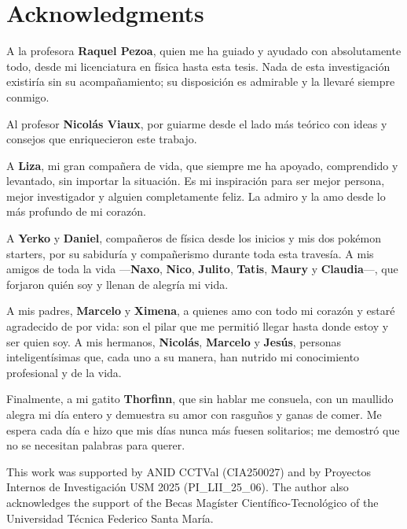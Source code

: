 \chapter*{Acknowledgments}
\linespread{1.12}\selectfont

A la profesora {\bfseries\color{darkred}Raquel Pezoa}, quien me ha guiado y
ayudado con absolutamente todo, desde mi licenciatura en física hasta esta tesis.
Nada de esta investigación existiría sin su acompañamiento; su disposición es
admirable y la llevaré siempre conmigo.

Al profesor {\bfseries\color{darkred}Nicolás Viaux}, por guiarme desde el lado
más teórico con ideas y consejos que enriquecieron este trabajo.

A {\bfseries\color{darkred}Liza}, mi gran compañera de vida, que siempre me ha
apoyado, comprendido y levantado, sin importar la situación. Es mi inspiración
para ser mejor persona, mejor investigador y alguien completamente feliz. La
admiro y la amo desde lo más profundo de mi corazón.

A {\bfseries\color{darkred}Yerko} y {\bfseries\color{darkred}Daniel},
compañeros de física desde los inicios y mis dos pokémon starters, por su
sabiduría y compañerismo durante toda esta travesía. A mis amigos de toda la
vida ---{\bfseries\color{darkred}Naxo}, {\bfseries\color{darkred}Nico},
{\bfseries\color{darkred}Julito}, {\bfseries\color{darkred}Tatis},
{\bfseries\color{darkred}Maury} y {\bfseries\color{darkred}Claudia}---, que
forjaron quién soy y llenan de alegría mi vida.

A mis padres, {\bfseries\color{darkred}Marcelo} y
{\bfseries\color{darkred}Ximena}, a quienes amo con todo mi corazón y estaré
agradecido de por vida: son el pilar que me permitió llegar hasta donde estoy y
ser quien soy. A mis hermanos, {\bfseries\color{darkred}Nicolás},
{\bfseries\color{darkred}Marcelo} y {\bfseries\color{darkred}Jesús}, personas
inteligentísimas que, cada uno a su manera, han nutrido mi conocimiento
profesional y de la vida.

Finalmente, a mi gatito {\bfseries\color{darkred}Thorfinn}, que sin hablar me
consuela, con un maullido alegra mi día entero y demuestra su amor con rasguños
y ganas de comer. Me espera cada día e hizo que mis días nunca más fuesen
solitarios; me demostró que no se necesitan palabras para querer.

\begin{center}
\end{center}

{\linespread{1.0}\selectfont\small This work was supported by ANID CCTVal (CIA250027) and by Proyectos Internos de Investigación USM 2025 (PI\_LII\_25\_06). The author also acknowledges the support of the Becas Magíster Científico-Tecnológico of the Universidad Técnica Federico Santa María.\par}
